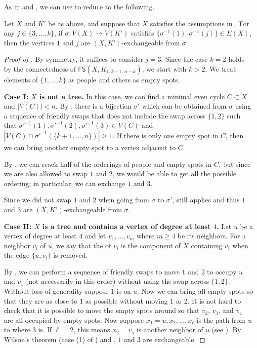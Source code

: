 \documentclass{mystyle}
\newcommand{\FS}{\mathsf{FS}}
\begin{document}
As in  and , we can use  to reduce  to the following.
\begin{theorem}\label{thm_two_comps_reduction}
    Let $X$ and $K'$ be as above, and suppose that $X$ satisfies the assumptions in . For any $j \in \{3, \ldots, k\}$, if $\sigma: V(X) \to V(K')$ satisfies $\{\sigma^{-1}(1), \sigma^{-1}(j)\} \in E(X)$, then the vertices $1$ and $j$ are $(X, K')$-exchangeable from $\sigma$. 
\end{theorem}
\begin{proof}[Proof of ]
    By symmetry, it suffices to consider $j = 3$. Since the case $k = 2$ holds by the connectedness of $\FS(X, K_{1, k-1, n - k})$, we start with $k > 2$. We treat elements of $\{1, \ldots, k\}$ as people and others as empty spots. 

    \textbf{Case I: $X$ is not a tree.} In this case, we can find a minimal even cycle $C \subset X$ and $|V(C)| < n$. By , there is a bijection $\sigma'$ which can be obtained from $\sigma$ using a sequence of friendly swaps that does not include the swap across $\{1, 2\}$ such that $\sigma'^{-1}(1), \sigma'^{-1}(2), \sigma'^{-1}(3) \in V(C)$ and $|V(C) \cap \sigma'^{-1}(\{k + 1, \ldots, n\})| \geq 1$. If there is only one empty spot in $C$, then we can bring another empty spot to a vertex adjacent to $C$.
    
    By , we can reach half of the orderings of people and empty spots in $C$, but since we are also allowed to swap $1$ and $2$, we would be able to get all the possible ordering; in particular, we can exchange $1$ and $3$.

    Since we did not swap $1$ and $2$ when going from $\sigma$ to $\sigma'$,  still applies and thus $1$ and $3$ are $(X, K')$-exchangeable from $\sigma$. 
    
    \textbf{Case II: $X$ is a tree and contains a vertex of degree at least $4$.} Let $u$ be a vertex of degree at least $4$ and let $v_1, \ldots, v_m$ where $m \geq 4$ be its neighbors. For a neighbor $v_i$ of $u$, we say that the  of $v_i$ is the component of $X$ containing $v_i$ when the edge $\{u, v_i\}$ is removed. 
    
    By , we can perform a sequence of friendly swaps to move $1$ and $2$ to occupy $u$ and $v_1$ (not necessarily in this order) without using the swap across $\{1, 2\}$. Without loss of generality suppose $1$ is on $u$. Now we can bring all empty spots so that they are as close to $1$ as possible without moving $1$ or $2$. It is not hard to check that it is possible to move the empty spots around so that $v_2$, $v_3$, and $v_4$ are all occupied by empty spots. Now suppose $x_1 = u, x_2, \ldots, x_\ell$ is the path from $u$ to where $3$ is. If $\ell = 2$, this means $x_2 = v_5$ is another neighbor of $u$ (see ). By Wilson's theorem (case (1) of ) and , $1$ and $3$ are exchangeable.


\end{proof}
\end{document}
